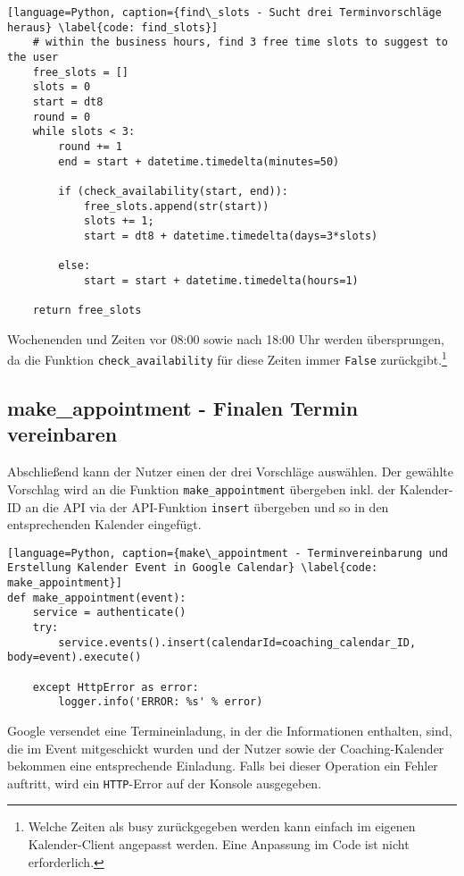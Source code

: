             \begin{lstlisting}[language=Python, caption={find\_slots - Sucht drei Terminvorschläge heraus} \label{code: find_slots}]
    # within the business hours, find 3 free time slots to suggest to the user
    free_slots = []
    slots = 0
    start = dt8
    round = 0
    while slots < 3:
        round += 1
        end = start + datetime.timedelta(minutes=50)
        
        if (check_availability(start, end)): 
            free_slots.append(str(start))
            slots += 1;
            start = dt8 + datetime.timedelta(days=3*slots)

        else: 
            start = start + datetime.timedelta(hours=1)
        
    return free_slots
            \end{lstlisting}
            Wochenenden und Zeiten vor 08:00 sowie nach 18:00 Uhr werden übersprungen, da die Funktion \verb|check_availability| für diese Zeiten immer \verb|False| zurückgibt.\footnote{Welche Zeiten als busy zurückgegeben werden kann einfach im eigenen Kalender-Client angepasst werden. Eine Anpassung im Code ist nicht erforderlich.}


        \subsection{make\_appointment - Finalen Termin vereinbaren}
            Abschließend kann der Nutzer einen der drei Vorschläge auswählen. Der gewählte Vorschlag wird an die Funktion \verb|make_appointment| übergeben inkl. der Kalender-ID an die API via der API-Funktion \verb|insert| übergeben und so in den entsprechenden Kalender eingefügt. 

            \begin{lstlisting}[language=Python, caption={make\_appointment - Terminvereinbarung und Erstellung Kalender Event in Google Calendar} \label{code: make_appointment}]
def make_appointment(event):
    service = authenticate()
    try:
        service.events().insert(calendarId=coaching_calendar_ID, body=event).execute()

    except HttpError as error:
        logger.info('ERROR: %s' % error)
            \end{lstlisting}
            Google versendet eine Termineinladung, in der die Informationen enthalten, sind, die im Event mitgeschickt wurden und der Nutzer sowie der Coaching-Kalender bekommen eine entsprechende Einladung. Falls bei dieser Operation ein Fehler auftritt, wird ein \verb|HTTP|-Error auf der Konsole ausgegeben.

